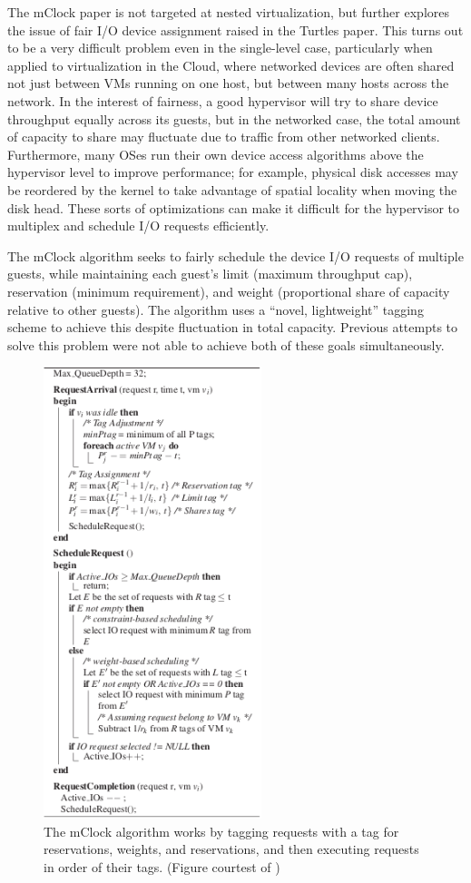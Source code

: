 \documentclass[letterpaper, twocolumn]{article}
\begin{document}
The mClock paper \cite{ref:mclock} is not targeted at nested virtualization,
but further explores
the issue of fair I/O device assignment raised in the Turtles paper.  This turns
out to be a very difficult problem even in the single-level case, particularly
when applied to virtualization in the Cloud, where networked devices are
often shared not just between VMs running on one host, but between many hosts
across the network.  In the interest of fairness, a good hypervisor will try to
share device throughput equally across its guests, but in the networked case, the
total amount of capacity to share may fluctuate due to traffic from other
networked clients.  Furthermore, many OSes run their own device access algorithms
above the hypervisor level to improve performance; for example, physical disk
accesses may be reordered by the kernel to take advantage of spatial locality
when moving the disk head.  These sorts of optimizations can make it difficult
for the hypervisor to multiplex and schedule I/O requests efficiently.

The mClock algorithm seeks to fairly schedule the device I/O requests of multiple guests,
while maintaining each guest's limit (maximum throughput cap), reservation
(minimum requirement), and weight (proportional share of capacity relative to
other guests).  The algorithm uses a ``novel, lightweight'' tagging scheme to
achieve this despite fluctuation in total capacity.  Previous attempts to solve
this problem were not able to achieve both of these goals simultaneously.

\begin{figure}[t]
	\begin{center}
		\includegraphics[width=2.5in]{images/mclock.png}
	\end{center}
	\caption{The mClock algorithm works by tagging requests with a tag for
		reservations, weights, and reservations, and then executing requests
		in order of their tags.  (Figure courtest of \cite{ref:mclock})}
	\label{fig:mclock-alg}
\end{figure}
\end{document}

